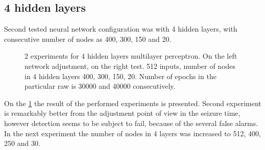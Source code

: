 \subsection{4 hidden layers}
Second tested neural network configuration was with 4 hidden layers, with consecutive number of nodes as 400, 300, 150 and 20. 
\begin{figure}[H]
	\begin{center}
	\end{center}
	\caption{2 experiments for 4 hidden layers multilayer perceptron. On the left network adjustment, on the right test. 512 inputs, number of nodes in 4 hidden layers 400, 300, 150, 20. Number of epochs in the particular raw is 30000 and 40000 consecutively.}

	\label{fig:nn_raw_4_hidden_512_400_300_150_20_1_30000_40000}
\end{figure}
On the \figurename{} \ref{fig:nn_raw_4_hidden_512_400_300_150_20_1_30000_40000}
the result of the performed experiments is presented. Second experiment is remarkably better from the adjustment point of view in the seizure time, however detection seems to be subject to fail, because of the several false alarms. In the next experiment the number of nodes in 4 layers was increased to 512, 400, 250 and 30.
